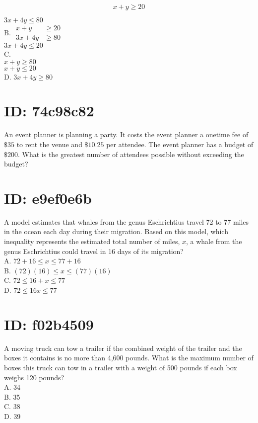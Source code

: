 $$
x+y \geq 20
$$

$3 x+4 y \leq 80$\\
B. $\begin{aligned} x+y & \geq 20 \\ 3 x+4 y & \geq 80\end{aligned}$\\
$3 x+4 y \leq 20$\\
C.\\
$x+y \geq 80$\\
$x+y \leq 20$\\
D. $3 x+4 y \geq 80$

\section*{ID: 74c98c82}
An event planner is planning a party. It costs the event planner a onetime fee of $\$ 35$ to rent the venue and $\$ 10.25$ per attendee. The event planner has a budget of $\$ 200$. What is the greatest number of attendees possible without exceeding the budget?

\section*{ID: e9ef0e6b}
A model estimates that whales from the genus Eschrichtius travel 72 to 77 miles in the ocean each day during their migration. Based on this model, which inequality represents the estimated total number of miles, $x$, a whale from the genus Eschrichtius could travel in 16 days of its migration?\\
A. $72+16 \leq x \leq 77+16$\\
B. $(72)(16) \leq x \leq(77)(16)$\\
C. $72 \leq 16+x \leq 77$\\
D. $72 \leq 16 x \leq 77$

\section*{ID: f02b4509}
A moving truck can tow a trailer if the combined weight of the trailer and the boxes it contains is no more than 4,600 pounds. What is the maximum number of boxes this truck can tow in a trailer with a weight of 500 pounds if each box weighs 120 pounds?\\
A. 34\\
B. 35\\
C. 38\\
D. 39

